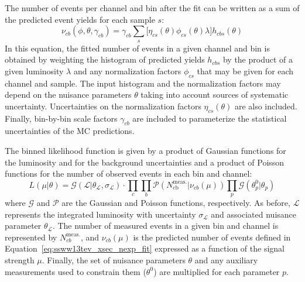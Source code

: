 The number of events per channel and bin after the fit can be written as a sum of the predicted event yields for each sample $s$:
\begin{equation}
  \nu_{cb}(\phi,\theta,\gamma_{cb}) = \gamma_{cb}\sum\limits_{s}\big[\eta_{cs}(\theta)\phi_{cs}(\theta)\lambda\big] h_{cbs}(\theta)
  \label{eq:ssww13tev_xsec_nexp_fit}
\end{equation}
In this equation, the fitted number of events in a given channel and bin is obtained by weighting the histogram of predicted yields $h_{cbs}$ by the product of a given luminosity $\lambda$ and any normalization factors $\phi_{cs}$ that may be given for each channel and sample.
The input histogram and the normalization factors may depend on the nuisance parameters $\theta$ taking into account sources of systematic uncertainty.
Uncertainties on the normalization factors $\eta_{cs}(\theta)$ are also included.
Finally, bin-by-bin scale factors $\gamma_{cb}$ are included to parameterize the statistical uncertainties of the MC predictions.

The binned likelihood function is given by a product of Gaussian functions for the luminosity and for the background uncertainties and a product of Poisson functions for the number of observed events in each bin and channel:
\begin{equation}
  L(\mu|\theta) = \mathcal{G}(\mathcal{L}|\theta_{\mathcal{L}},\sigma_{\mathcal{L}})\cdot \prod\limits_{c}\prod\limits_{b}\mathcal{P}(N_{\textrm{cb}}^{\textrm{meas.}}|\nu_{cb}(\mu))\prod\limits_{p}\mathcal{G}(\theta_{p}^{0}|\theta_{p})
\end{equation}
where $\mathcal{G}$ and $\mathcal{P}$ are the Gaussian and Poisson functions, respectively.
As before, $\mathcal{L}$ represents the integrated luminosity with uncertainty $\sigma_{\mathcal{L}}$ and associated nuisance parameter $\theta_{\mathcal{L}}$.
The number of measured events in a given bin and channel is represented by $N_{cb}^{\textrm{meas.}}$, and $\nu_{cb}(\mu)$ is the predicted number of events defined in Equation~\ref{eq:ssww13tev_xsec_nexp_fit} expressed as a function of the signal strength $\mu$.
Finally, the set of nuisance parameters $\theta$ and any auxiliary measurements used to constrain them ($\theta^0$) are multiplied for each parameter $p$.

